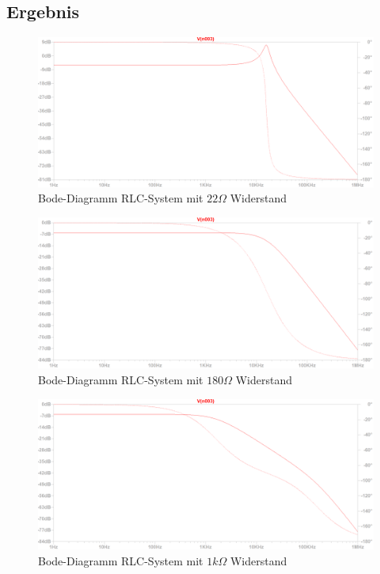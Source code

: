 \documentclass[12pt,a4paper,titlepage]{article}
\begin{document}
\subsection{Ergebnis}
\begin{figure}[H]
  \centering
  \includegraphics[width=150mm]{bode_filter03_22o.PNG}
  \caption{Bode-Diagramm RLC-System mit $22 \Omega$ Widerstand}
  \label{aufgabe3_bode1}
\end{figure}
\begin{figure}[H]
  \centering
  \includegraphics[width=150mm]{bode_filter03_180o.PNG}
  \caption{Bode-Diagramm RLC-System mit $180 \Omega$ Widerstand}
\end{figure}
\begin{figure}[H]
  \centering
  \includegraphics[width=150mm]{bode_filter03_1ko.PNG}
  \caption{Bode-Diagramm RLC-System mit $1 k\Omega$ Widerstand}
\end{figure}
\end{document}
